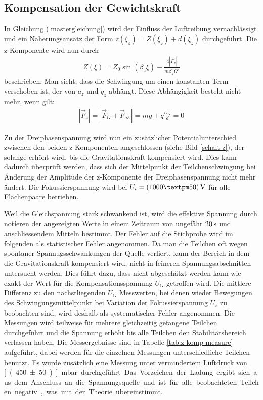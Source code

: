 \documentclass[a4paper,12pt]{article}
\begin{document}
\subsection{Kompensation der Gewichtskraft}
In Gleichung (\ref{mastergleichung}) wird der Einfluss der Luftreibung vernachlässigt und ein Näherungsansatz der Form $z(ξ_z) = Z(ξ_z)+d(ξ_z)$ durchgeführt.
Die z-Komponente wird nun durch
\begin{align*}
	Z(ξ) = Z_0\sin(β_zξ) - \frac{4|\vec{F}_z|}{mβ_zΩ^2}
\end{align*}
beschrieben.
Man sieht, dass die Schwingung um einen konstanten Term verschoben ist, der von $a_z$ und $q_z$ abhängt.
Diese Abhängigkeit besteht nicht mehr, wenn gilt:
\begin{align}
	\label{kraftgleichgew}
	|\vec{F}_{z}| = |\vec{F}_G + \vec{F}_{qE}| = mg + q\frac{U_G}{d} = 0
\end{align}
%

Zu der Dreiphasenspannung wird nun ein zusätzlicher Potentialunterschied zwischen den beiden z-Komponenten angeschlossen (siehe Bild \ref{schalt-z}), der solange erhöht wird, bis die Gravitationskraft kompensiert wird.
Dies kann dadurch überprüft werden, dass sich der Mittelpunkt der Teilchenschwingung bei Änderung der Amplitude der z-Komponente der Dreiphasenspannung nicht mehr ändert.
Die Fokussierspannung wird bei $U_i = \unit[(1000±50)]{V}$ für alle Flächenpaare betrieben.


Weil die Gleichspannung stark schwankend ist, wird die effektive Spannung durch notieren der angezeigten Werte in einem Zeitraum von ungefähr $\unit[20]{s}$ und anschliessendem Mitteln bestimmt. 
Der Fehler auf die Stichprobe wird im folgenden als statistischer Fehler angenommen.
Da man die Teilchen oft wegen spontaner Spannugsschwankungen der Quelle verliert, kann der Bereich in dem die Gravitationskraft kompensiert wird, nicht in feineren Spannungsabschnitten untersucht werden.
Dies führt dazu, dass nicht abgeschätzt werden kann wie exakt der Wert für die Kompensationsspannung $U_G$ getroffen wird.
Die mittlere Differenz zu den nächstliegenden $U_G$ Messwerten, bei denen wieder Bewegungen des Schwingungsmittelpunkt bei Variation der Fokussierspannung $U_z$ zu beobachten sind,
wird deshalb als systematischer Fehler angenommen.
Die Messungen wird teilweise für mehrere gleichzeitig gefangene Teilchen durchgeführt und die Spannung erhöht bis alle Teilchen den Stabilitätsbereich verlassen haben. Die Messergebnisse sind in
Tabelle \ref{tab:z-komp-measure} aufgeführt, dabei werden für die einzelnen Messungen unterschiedliche Teilchen benutzt. Es wurde zusätzlich eine Messung unter vermindertem Luftdruck von
 \unit[(450±50)]{mbar} durchgeführt.
Das Vorzeichen der Ladung ergibt sich aus dem Anschluss an die Spannungsquelle und ist für alle beobachteten Teilchen negativ, was mit der Theorie übereinstimmt.
\end{document}
